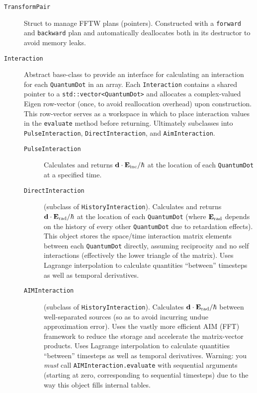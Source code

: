\begin{description}
  \item[\texttt{TransformPair}] Struct to manage FFTW plans (pointers). Constructed with a \lstinline!forward! and \lstinline!backward! plan and automatically deallocates both in its destructor to avoid memory leaks.
  \item[\texttt{Interaction}] Abstract base-class to provide an interface for calculating an interaction for each \lstinline!QuantumDot! in an array.
    Each \lstinline!Interaction! contains a shared pointer to a \lstinline!std::vector<QuantumDot>! and allocates a complex-valued Eigen row-vector (once, to avoid reallocation overhead) upon construction.
    This row-vector serves as a workspace in which to place interaction values in the \lstinline!evaluate! method before returning.
    Ultimately subclasses into \lstinline!PulseInteraction!, \lstinline!DirectInteraction!, and \lstinline!AimInteraction!.
    \begin{description}
      \item[\texttt{PulseInteraction}] Calculates and returns $\vb{d} \cdot \vb{E}_\text{inc}/\hbar$ at the location of each \lstinline!QuantumDot! at a specified time.
      \item[\texttt{DirectInteraction}] (subclass of \lstinline!HistoryInteraction!).
        Calculates and returns $\vb{d} \cdot \vb{E}_\text{rad}/\hbar$ at the location of each \lstinline!QuantumDot! (where $\vb{E}_\text{rad}$ depends on the history of every other \lstinline!QuantumDot! due to retardation effects).
        This object stores the space/time interaction matrix elements between each \lstinline!QuantumDot! directly, assuming reciprocity and no self interactions (effectively the lower triangle of the matrix).
        Uses Lagrange interpolation to calculate quantities ``between'' timesteps as well as temporal derivatives.
      \item[\texttt{AIMInteraction}] (subclass of \lstinline!HistoryInteraction!).
        Calculates $\vb{d} \cdot \vb{E}_\text{rad}/\hbar$ between well-separated sources (so as to avoid incurring undue approximation error).
        Uses the vastly more efficient AIM (FFT) framework to reduce the storage and accelerate the matrix-vector products.
        Uses Lagrange interpolation to calculate quantities ``between'' timesteps as well as temporal derivatives.
        \textcolor{Red!90!black}{Warning:} you \emph{must} call \lstinline!AIMInteraction.evaluate! with sequential arguments (starting at zero, corresponding to sequential timesteps) due to the way this object fills internal tables.

\end{description}
\end{description}
